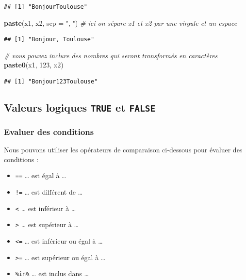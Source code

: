 \documentclass[
]{book}
\newenvironment{Shaded}{\begin{snugshade}}{\end{snugshade}}
\newcommand{\AttributeTok}[1]{\textcolor[rgb]{0.13,0.29,0.53}{#1}}
\newcommand{\CommentTok}[1]{\textcolor[rgb]{0.56,0.35,0.01}{\textit{#1}}}
\newcommand{\DecValTok}[1]{\textcolor[rgb]{0.00,0.00,0.81}{#1}}
\newcommand{\FunctionTok}[1]{\textcolor[rgb]{0.13,0.29,0.53}{\textbf{#1}}}
\newcommand{\NormalTok}[1]{#1}
\newcommand{\StringTok}[1]{\textcolor[rgb]{0.31,0.60,0.02}{#1}}
\providecommand{\tightlist}{%
  \setlength{\itemsep}{0pt}\setlength{\parskip}{0pt}}
\begin{document}
\begin{verbatim}
## [1] "BonjourToulouse"
\end{verbatim}

\begin{Shaded}
\begin{Highlighting}[]
\FunctionTok{paste}\NormalTok{(x1, x2, }\AttributeTok{sep =} \StringTok{", "}\NormalTok{) }\CommentTok{\# ici on sépare x1 et x2 par une virgule et un espace}
\end{Highlighting}
\end{Shaded}

\begin{verbatim}
## [1] "Bonjour, Toulouse"
\end{verbatim}

\begin{Shaded}
\begin{Highlighting}[]
\CommentTok{\# vous pouvez inclure des nombres qui seront transformés en caractères}
\FunctionTok{paste0}\NormalTok{(x1, }\DecValTok{123}\NormalTok{, x2)}
\end{Highlighting}
\end{Shaded}

\begin{verbatim}
## [1] "Bonjour123Toulouse"
\end{verbatim}

\subsection{\texorpdfstring{Valeurs logiques \texttt{TRUE} et \texttt{FALSE}}{Valeurs logiques TRUE et FALSE}}\label{valeurs-logiques-true-et-false}

\subsubsection{Evaluer des conditions}\label{evaluer-des-conditions}

Nous pouvons utiliser les opérateurs de comparaison ci-dessous pour évaluer des conditions :

\begin{itemize}
\tightlist
\item
  \texttt{==} \ldots{} est égal à \ldots{}
\item
  \texttt{!=} \ldots{} est différent de \ldots{}
\item
  \texttt{\textless{}} \ldots{} est inférieur à \ldots{}
\item
  \texttt{\textgreater{}} \ldots{} est supérieur à \ldots{}
\item
  \texttt{\textless{}=} \ldots{} est inférieur ou égal à \ldots{}
\item
  \texttt{\textgreater{}=} \ldots{} est supérieur ou égal à \ldots{}
\item
  \texttt{\%in\%} \ldots{} est inclus dans \ldots{}
\end{itemize}
\end{document}
